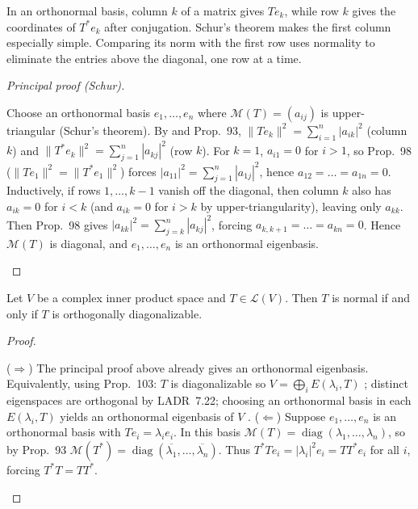 \documentclass[10pt]{scrartcl}
\newcommand{\LL}{\mathcal L}\newcommand{\PP}{\mathcal P}\newcommand{\MM}{\mathcal M}
\begin{document}
\begin{ideabox}
  In an orthonormal basis, column $k$ of a matrix gives $Te_k$, while row $k$ gives the coordinates of $T^*e_k$ after conjugation. Schur's theorem makes the first column especially simple. Comparing its norm with the first row uses normality to eliminate the entries above the diagonal, one row at a time.
\end{ideabox}
\begin{proof}[Principal proof (Schur)]
  \begin{steps}
    \ii Choose an orthonormal basis $e_1,\dots,e_n$ where $\MM(T)=(a_{ij})$ is upper-triangular (Schur's theorem). By  and Prop.~93, $\|Te_k\|^2=\sum_{i=1}^n |a_{ik}|^2$ (column $k$) and $\|T^*e_k\|^2=\sum_{j=1}^n |a_{kj}|^2$ (row $k$).
    \ii For $k=1$, $a_{i1}=0$ for $i>1$, so Prop.~98 ($\|Te_1\|^2=\|T^*e_1\|^2$) forces $|a_{11}|^2 = \sum_{j=1}^n |a_{1j}|^2$, hence $a_{12}=\dots=a_{1n}=0$.
    \ii Inductively, if rows $1,\dots,k-1$ vanish off the diagonal, then column $k$ also has $a_{ik}=0$ for $i<k$ (and $a_{ik}=0$ for $i>k$ by upper-triangularity), leaving only $a_{kk}$. Then Prop.~98 gives $|a_{kk}|^2 = \sum_{j=k}^n |a_{kj}|^2$, forcing $a_{k,k+1}=\dots=a_{kn}=0$.
    \ii Hence $\MM(T)$ is diagonal, and $e_1,\dots,e_n$ is an orthonormal eigenbasis.
  \end{steps}
\end{proof}



\begin{theorem*}
  Let $V$ be a complex inner product space and $T\in\LL(V)$. Then $T$ is normal if and only if $T$ is orthogonally diagonalizable.
\end{theorem*}
\begin{proof}
  \begin{steps}
    \ii ($\Rightarrow$) The principal proof above already gives an orthonormal eigenbasis. Equivalently, using Prop.~103: $T$ is diagonalizable so $V=\bigoplus_i E(\lambda_i,T)$ ; distinct eigenspaces are orthogonal by LADR~7.22; choosing an orthonormal basis in each $E(\lambda_i,T)$  yields an orthonormal eigenbasis of $V$ .
    \ii ($\Leftarrow$) Suppose $e_1,\dots,e_n$ is an orthonormal basis with $Te_i=\lambda_i e_i$. In this basis $\MM(T)=\operatorname{diag}(\lambda_1,\dots,\lambda_n)$, so by Prop.~93 $\MM(T^*)=\operatorname{diag}(\overline{\lambda_1},\dots,\overline{\lambda_n})$. Thus $T^*Te_i = |\lambda_i|^2 e_i = TT^*e_i$ for all $i$, forcing $T^*T=TT^*$.
  \end{steps}
\end{proof}
\end{document}
